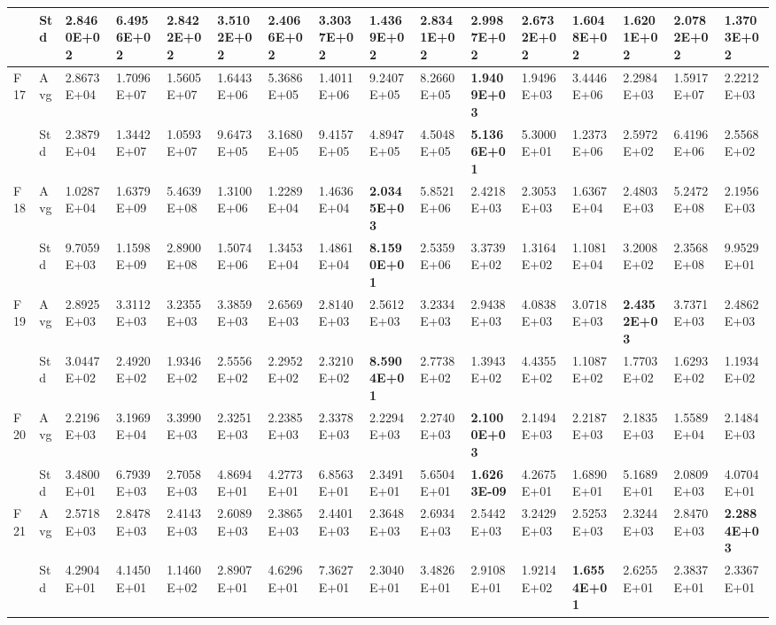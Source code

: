 \documentclass{article} %
\begin{document}
\begin{tabular}{|p{0.3in}|p{0.3in}|p{0.3in}|p{0.3in}|p{0.3in}|p{0.3in}|p{0.3in}|p{0.3in}|p{0.3in}|p{0.3in}|p{0.3in}|p{0.3in}|p{0.3in}|p{0.3in}|p{0.3in}|p{0.5in}|}
 & Std & 2.8460E+02 & 6.4956E+02 & 2.8422E+02 & 3.5102E+02 & 2.4066E+02 & 3.3037E+02 & 1.4369E+02 & 2.8341E+02 & 2.9987E+02 & 2.6732E+02 & 1.6048E+02 & 1.6201E+02 & 2.0782E+02 & \textbf{1.3703E+02} \\ \hline 
F17 & Avg & 2.8673E+04 & 1.7096E+07 & 1.5605E+07 & 1.6443E+06 & 5.3686E+05 & 1.4011E+06 & 9.2407E+05 & 8.2660E+05 & \textbf{1.9409E+03} & 1.9496E+03 & 3.4446E+06 & 2.2984E+03 & 1.5917E+07 & 2.2212E+03 \\ \hline 
 & Std & 2.3879E+04 & 1.3442E+07 & 1.0593E+07 & 9.6473E+05 & 3.1680E+05 & 9.4157E+05 & 4.8947E+05 & 4.5048E+05 & \textbf{5.1366E+01} & 5.3000E+01 & 1.2373E+06 & 2.5972E+02 & 6.4196E+06 & 2.5568E+02 \\ \hline 
F18 & Avg & 1.0287E+04 & 1.6379E+09 & 5.4639E+08 & 1.3100E+06 & 1.2289E+04 & 1.4636E+04 & \textbf{2.0345E+03} & 5.8521E+06 & 2.4218E+03 & 2.3053E+03 & 1.6367E+04 & 2.4803E+03 & 5.2472E+08 & 2.1956E+03 \\ \hline 
 & Std & 9.7059E+03 & 1.1598E+09 & 2.8900E+08 & 1.5074E+06 & 1.3453E+04 & 1.4861E+04 & \textbf{8.1590E+01} & 2.5359E+06 & 3.3739E+02 & 1.3164E+02 & 1.1081E+04 & 3.2008E+02 & 2.3568E+08 & 9.9529E+01 \\ \hline 
F19 & Avg & 2.8925E+03 & 3.3112E+03 & 3.2355E+03 & 3.3859E+03 & 2.6569E+03 & 2.8140E+03 & 2.5612E+03 & 3.2334E+03 & 2.9438E+03 & 4.0838E+03 & 3.0718E+03 & \textbf{2.4352E+03} & 3.7371E+03 & 2.4862E+03 \\ \hline 
 & Std & 3.0447E+02 & 2.4920E+02 & 1.9346E+02 & 2.5556E+02 & 2.2952E+02 & 2.3210E+02 & \textbf{8.5904E+01} & 2.7738E+02 & 1.3943E+02 & 4.4355E+02 & 1.1087E+02 & 1.7703E+02 & 1.6293E+02 & 1.1934E+02 \\ \hline 
F20 & Avg & 2.2196E+03 & 3.1969E+04 & 3.3990E+03 & 2.3251E+03 & 2.2385E+03 & 2.3378E+03 & 2.2294E+03 & 2.2740E+03 & \textbf{2.1000E+03} & 2.1494E+03 & 2.2187E+03 & 2.1835E+03 & 1.5589E+04 & 2.1484E+03 \\ \hline 
 & Std & 3.4800E+01 & 6.7939E+03 & 2.7058E+03 & 4.8694E+01 & 4.2773E+01 & 6.8563E+01 & 2.3491E+01 & 5.6504E+01 & \textbf{1.6263E-09} & 4.2675E+01 & 1.6890E+01 & 5.1689E+01 & 2.0809E+03 & 4.0704E+01 \\ \hline 
F21 & Avg & 2.5718E+03 & 2.8478E+03 & 2.4143E+03 & 2.6089E+03 & 2.3865E+03 & 2.4401E+03 & 2.3648E+03 & 2.6934E+03 & 2.5442E+03 & 3.2429E+03 & 2.5253E+03 & 2.3244E+03 & 2.8470E+03 & \textbf{2.2884E+03} \\ \hline 
 & Std & 4.2904E+01 & 4.1450E+01 & 1.1460E+02 & 2.8907E+01 & 4.6296E+01 & 7.3627E+01 & 2.3040E+01 & 3.4826E+01 & 2.9108E+01 & 1.9214E+02 & \textbf{1.6554E+01} & 2.6255E+01 & 2.3837E+01 & 2.3367E+01 \\ \hline 

\end{tabular}
\end{document}
